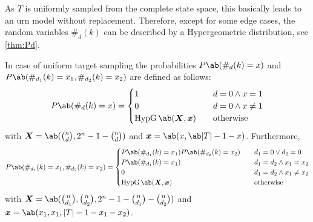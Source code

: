 As $T$ is uniformly sampled from the complete state space, this basically leads to an urn model without replacement. Therefore, except for some edge cases, the random variables $\#_d (k)$ can be described by a Hypergeometric distribution, see \cref{thm:Pd}.

\pagebreak
\begin{widetext}
\begin{lemma}
    \label{thm:Pd}
    In case of uniform target sampling the probabilities $P\ab(\#_d (k) = x)$ and $P\ab(\#_{d_1} (k) = x_1, \#_{d_2} (k) = x_2)$ are defined as follows:
    \begin{equation}
        \label{eq:Pd}
        P\ab(\#_d (k) = x) = 
        \begin{cases}
            1 &\quad d = 0 \wedge x = 1 \\
            0 &\quad d = 0 \wedge x \neq 1 \\
            \hypgeom \ab(\bm{X}, \bm{x}) &\quad \text{otherwise}
        \end{cases}
    \end{equation}
    with $\bm{X} = \ab(\binom{n}{d}, 2^n - 1 - \binom{n}{d})$ and $\bm{x} = \ab(x, \ab|T| - 1 - x)$. Furthermore, 
    \begin{equation}
        \label{eq:Pd1d2}
        P\ab(\#_{d_1} (k) = x_1, \#_{d_2} (k) = x_2) = \begin{cases}
            P\ab(\#_{d_1} (k) = x_1) P\ab(\#_{d_2} (k) = x_2) &\quad d_1 = 0 \vee d_2 = 0 \\
            P\ab(\#_{d_1} (k) = x_1) &\quad d_1 = d_2 \wedge x_1 = x_2 \\
            0 &\quad d_1 = d_2 \wedge x_1 \neq x_2 \\
            \hypgeom \ab(\bm{X}, \bm{x}) &\quad \text{otherwise}
        \end{cases}
    \end{equation}
    with $\bm{X} = \ab(\binom{n}{d_1}, \binom{n}{d_2}, 2^n - 1 - \binom{n}{d_1} - \binom{n}{d_2})$ and $\bm{x} = \ab(x_1, x_1, |T| - 1 - x_1 - x_2)$.
\end{lemma}
\end{widetext}

